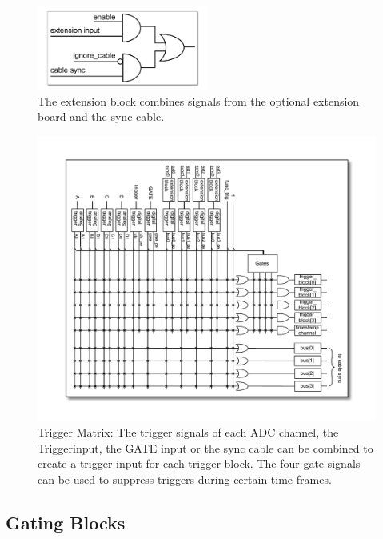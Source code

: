 		\begin{figure}
			\begin{center}
				\includegraphics[width=0.5\textwidth]{figures/ExtensionBlock.pdf}
				\caption{\label{fig:ExtensionBlock} The extension block combines signals from the optional extension board and the sync cable.}
			\end{center}
		\end{figure}
		
		\begin{figure}
			\begin{center}
				\includegraphics[width=\textwidth]{figures/triggermatrix.pdf}
				\caption{Trigger Matrix: The trigger signals of each ADC channel, the Triggerinput, the GATE input or the sync cable can be combined to create a trigger input for each trigger block.
The four gate signals can be used to suppress triggers during certain time frames.\label{fig:triggermatrix}}
			\end{center}
		\end{figure}
	
	\subsection{Gating Blocks}
		
